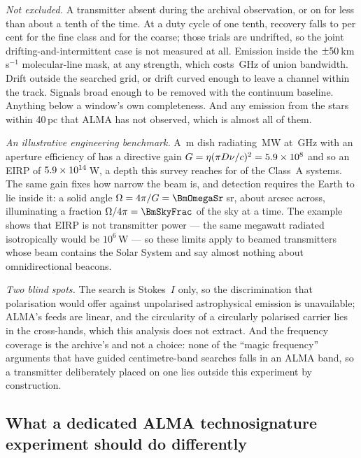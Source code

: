 \noindent\emph{Not excluded.} A transmitter absent during the archival
observation, or on for less than about a tenth of the time. At a duty cycle
of one tenth, recovery falls
to \DwellFineT{} per cent for the fine class and \DwellCoarseT{} for the
coarse; those trials are undrifted, so the joint drifting-and-intermittent
case is not measured at all. Emission inside the
$\pm50$\,km\,s$^{-1}$ molecular-line mask, at any strength, which
costs \FrMaskLostGHz\,GHz of union bandwidth. Drift outside the searched grid, or
drift curved enough to leave a channel within the track. Signals broad enough
to be removed with the continuum baseline. Anything below a window's own
completeness. And any emission from the \NGaiaCensus{} stars within 40\,pc
that ALMA has not observed, which is almost all of them.

\noindent\emph{An illustrative engineering benchmark.} A \BenchDiam\,m dish
radiating \BenchPowerMW\,MW at \BenchFreqGHz\,GHz with an aperture efficiency
of \BenchEta{} has a directive gain $G=\eta(\pi D\nu/c)^{2}=5.9\times10^{8}$ and so
an EIRP of $5.9\times10^{14}$\,W, a depth this survey reaches for \BenchNSysA{} of
the \NSysClassA{} Class~A systems. The same gain fixes how narrow the beam is,
and detection requires the Earth to lie inside it: a solid angle
$\Omega=4\pi/G=\BmOmegaSr$\,sr, about \BmArcsec{} arcsec across, illuminating a
fraction $\Omega/4\pi=\BmSkyFrac$ of the sky at a time. The example shows that EIRP is not transmitter power --- the
same megawatt radiated isotropically would be $10^{6}$\,W --- so these limits
apply to beamed transmitters whose beam contains the Solar System and say
almost nothing about omnidirectional beacons.

\noindent\emph{Two blind spots.} The search is Stokes~$I$ only, so the
discrimination that polarisation would offer against unpolarised
astrophysical emission is unavailable; ALMA's feeds are linear, and the
circularity of a circularly polarised carrier lies in the cross-hands, which
this analysis does not extract. And the frequency coverage is the archive's
and not a choice: none of the ``magic frequency'' arguments that have guided
centimetre-band searches falls in an ALMA band, so a transmitter deliberately
placed on one lies outside this experiment by construction.

\subsection{What a dedicated ALMA technosignature experiment should do
differently}
\label{sec:future}

